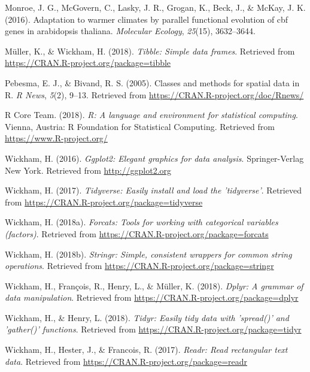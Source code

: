 \documentclass[man,floatsintext]{apa6}
\begin{document}
\leavevmode\hypertarget{ref-monroe2016adaptation}{}%
Monroe, J. G., McGovern, C., Lasky, J. R., Grogan, K., Beck, J., \&
McKay, J. K. (2016). Adaptation to warmer climates by parallel
functional evolution of cbf genes in arabidopsis thaliana.
\emph{Molecular Ecology}, \emph{25}(15), 3632--3644.

\leavevmode\hypertarget{ref-R-tibble}{}%
Müller, K., \& Wickham, H. (2018). \emph{Tibble: Simple data frames}.
Retrieved from \url{https://CRAN.R-project.org/package=tibble}

\leavevmode\hypertarget{ref-R-sp}{}%
Pebesma, E. J., \& Bivand, R. S. (2005). Classes and methods for spatial
data in R. \emph{R News}, \emph{5}(2), 9--13. Retrieved from
\url{https://CRAN.R-project.org/doc/Rnews/}

\leavevmode\hypertarget{ref-R-base}{}%
R Core Team. (2018). \emph{R: A language and environment for statistical
computing}. Vienna, Austria: R Foundation for Statistical Computing.
Retrieved from \url{https://www.R-project.org/}

\leavevmode\hypertarget{ref-R-ggplot2}{}%
Wickham, H. (2016). \emph{Ggplot2: Elegant graphics for data analysis}.
Springer-Verlag New York. Retrieved from \url{http://ggplot2.org}

\leavevmode\hypertarget{ref-R-tidyverse}{}%
Wickham, H. (2017). \emph{Tidyverse: Easily install and load the
'tidyverse'}. Retrieved from
\url{https://CRAN.R-project.org/package=tidyverse}

\leavevmode\hypertarget{ref-R-forcats}{}%
Wickham, H. (2018a). \emph{Forcats: Tools for working with categorical
variables (factors)}. Retrieved from
\url{https://CRAN.R-project.org/package=forcats}

\leavevmode\hypertarget{ref-R-stringr}{}%
Wickham, H. (2018b). \emph{Stringr: Simple, consistent wrappers for
common string operations}. Retrieved from
\url{https://CRAN.R-project.org/package=stringr}

\leavevmode\hypertarget{ref-R-dplyr}{}%
Wickham, H., François, R., Henry, L., \& Müller, K. (2018). \emph{Dplyr:
A grammar of data manipulation}. Retrieved from
\url{https://CRAN.R-project.org/package=dplyr}

\leavevmode\hypertarget{ref-R-tidyr}{}%
Wickham, H., \& Henry, L. (2018). \emph{Tidyr: Easily tidy data with
'spread()' and 'gather()' functions}. Retrieved from
\url{https://CRAN.R-project.org/package=tidyr}

\leavevmode\hypertarget{ref-R-readr}{}%
Wickham, H., Hester, J., \& Francois, R. (2017). \emph{Readr: Read
rectangular text data}. Retrieved from
\url{https://CRAN.R-project.org/package=readr}

\endgroup
\end{document}
